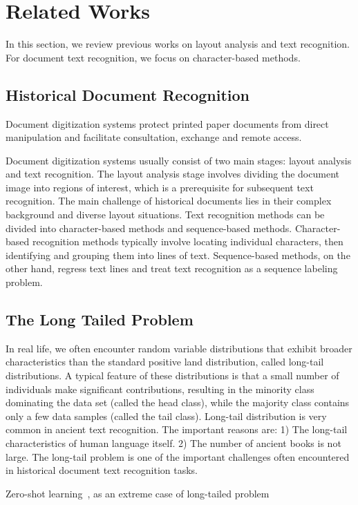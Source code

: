 \section{Related Works}
\label{sec:formatting}
In this section, we review previous works on layout analysis and text recognition. For document text recognition, we focus on character-based methods.


\subsection{Historical Document Recognition}
Document digitization systems protect printed paper documents from direct manipulation and facilitate consultation, exchange and remote access.

Document digitization systems usually consist of two main stages: layout analysis and text recognition. The layout analysis stage involves dividing the document image into regions of interest, which is a prerequisite for subsequent text recognition.
The main challenge of historical documents lies in their complex background and diverse layout situations. Text recognition methods can be divided into character-based methods and sequence-based methods. Character-based recognition methods typically involve locating individual characters, then identifying and grouping them into lines of text. Sequence-based methods, on the other hand, regress text lines and treat text recognition as a sequence labeling problem.


\subsection{The Long Tailed Problem}

In real life, we often encounter random variable distributions that exhibit broader characteristics than the standard positive land distribution, called long-tail distributions. 
A typical feature of these distributions is that a small number of individuals make significant contributions, resulting in the minority class dominating the data set (called the head class), while the majority class contains only a few data samples (called the tail class). Long-tail distribution is very common in ancient text recognition. The important reasons are: 1) The long-tail characteristics of human language itself. 2) The number of ancient books is not large. The long-tail problem is one of the important challenges often encountered in historical document text recognition tasks.

Zero-shot learning~\cite{gzsl-survey}, as an extreme case of long-tailed problem